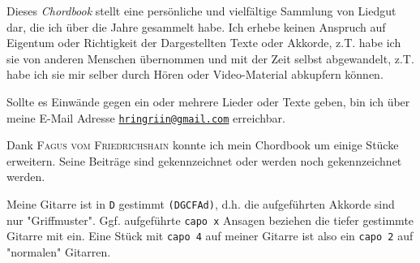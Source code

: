\begin{center}
    { \Large
        \begin{minipage}[h]{0.7\textwidth}
            \begin{tcolorbox}[colback=red!7,colframe=red!70!black,fonttitle=\bfseries,title=Disclaimer]
                Dieses \textit{Chordbook} stellt eine pers\"{o}nliche und vielf\"{a}ltige Sammlung von Liedgut dar, die ich \"{u}ber die Jahre gesammelt habe.
                Ich erhebe keinen Anspruch auf Eigentum oder Richtigkeit der Dargestellten Texte oder Akkorde, z.T. habe ich sie von anderen Menschen \"{u}bernommen und mit der Zeit selbst abgewandelt, z.T. habe ich sie mir selber durch H\"{o}ren oder Video-Material abkupfern k\"{o}nnen. \par\medskip

                Sollte es Einw\"{a}nde gegen ein oder mehrere Lieder oder Texte geben, bin ich \"{u}ber meine E-Mail Adresse \href{mailto:hringriin@gmail.com}{\texttt{hringriin@gmail.com}} erreichbar. \par\medskip

                Dank \textsc{Fagus vom Friedrichshain} konnte ich mein Chordbook um einige St\"{u}cke erweitern.
                Seine Beitr\"{a}ge sind gekennzeichnet oder werden noch gekennzeichnet werden.
            \end{tcolorbox}

            \vspace{2cm}

            \begin{tcolorbox}[colback=red!7,colframe=red!70!black,fonttitle=\bfseries,title=Stimmung der Gitarre]
                Meine Gitarre ist in \texttt{D} gestimmt \texttt{(DGCFAd)}, d.h. die aufgeführten Akkorde sind nur "Griffmuster".
                Ggf. aufgeführte \texttt{capo x} Ansagen beziehen die tiefer gestimmte Gitarre mit ein.
                Eine Stück mit \texttt{capo 4} auf meiner Gitarre ist also ein \texttt{capo 2} auf "normalen" Gitarren.
            \end{tcolorbox}
        \end{minipage}
    }
\end{center}
